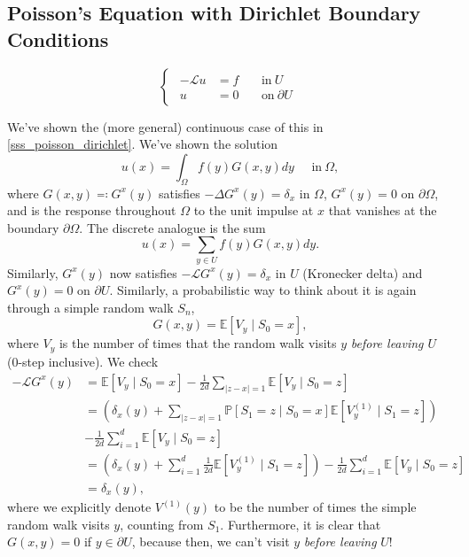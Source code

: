 \documentclass[openany, amssymb, psamsfonts]{amsart}
\theoremstyle{definition}
\numberwithin{equation}{section}
\newcommand{\bbp}{\mathbb{P}}
\newcommand{\bbe}{\mathbb{E}}
\newcommand{\call}{\mathcal{L}}
\begin{document}
\subsection{Poisson's Equation with Dirichlet Boundary Conditions}
 \begin{equation} \label{disc_poisson_dirichlet}
    \begin{cases}
        \begin{aligned}
            - \call u &= f && \:\text{in}\: U \\
            u &= 0 && \:\text{on}\: \partial U
        \end{aligned}
    \end{cases}
\end{equation}

We've shown the (more general) continuous case of this in \autoref{sss_poisson_dirichlet}. We've shown the solution
\[    
    u(x) = \int_{\Omega} f(y) G(x, y) dy  \;\;\;\;\; \text{in}\: \Omega,
\]
where $G(x, y) \eqqcolon G^x(y)$ satisfies $-\Delta G^x(y) = \delta_x$ in $\Omega$, $ G^x(y) = 0$ on $\partial \Omega$, and is the response throughout $\Omega$ to the unit impulse at $x$ that vanishes at the boundary $\partial \Omega$. The discrete analogue is the sum
\[
    u(x) = \sum_{y \in U} f(y) G(x, y) dy .
\]
Similarly, $G^x(y)$ now satisfies $-\call G^x(y) = \delta_x$ in $U$ (Kronecker delta) and $G^x(y) = 0$ on $\partial U$. Similarly, a probabilistic way to think about it is again through a simple random walk $S_n$,
    \[
        G(x, y) = \bbe [V_y \mid S_0 = x],
    \]
where $V_y$ is the number of times that the random walk visits $y$ \textit{before leaving $U$} (0-step inclusive). We check \begin{align*}
    - \call G^x(y) &= \bbe [V_y \mid S_0 = x]  - \frac{1}{2d}\sum_{|z - x| = 1} \bbe [V_y \mid S_0 = z] \\
    &= \left( \delta_x(y) + \sum_{|z-x| = 1} \bbp[S_1 = z \mid S_0 = x]\bbe[V^{(1)}_y \mid S_1 =z] \right) \\
    &- \frac{1}{2d}\sum_{i=1}^{d} \bbe [V_y \mid S_0 = z] \\
    &= \left( \delta_x(y) + \sum_{i=1}^{d} \frac{1}{2d}\bbe[V^{(1)}_y \mid S_1 = z] \right) - \frac{1}{2d}\sum_{i=1}^{d} \bbe [V_y \mid S_0 = z] \\
    &= \delta_x(y),
\end{align*}
where we explicitly denote $V^{(1)}(y)$ to be the number of times the simple random walk visits $y$, counting from $S_1$. Furthermore, it is clear that $G(x, y) = 0$ if $y \in \partial U$, because then, we can't visit $y$ \textit{before leaving} $U$!
\end{document}
